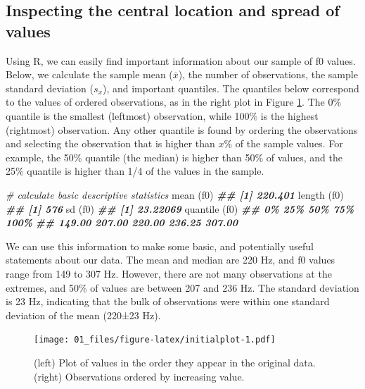\documentclass[
]{book}
\newenvironment{Shaded}{\begin{snugshade}}{\end{snugshade}}
\newcommand{\CommentTok}[1]{\textcolor[rgb]{0.56,0.35,0.01}{\textit{#1}}}
\newcommand{\DocumentationTok}[1]{\textcolor[rgb]{0.56,0.35,0.01}{\textbf{\textit{#1}}}}
\newcommand{\FunctionTok}[1]{\textcolor[rgb]{0.00,0.00,0.00}{#1}}
\newcommand{\NormalTok}[1]{#1}
\begin{document}
\hypertarget{inspecting-the-central-location-and-spread-of-values}{%
\subsection{Inspecting the central location and spread of values}\label{inspecting-the-central-location-and-spread-of-values}}

Using R, we can easily find important information about our sample of f0 values. Below, we calculate the sample mean (\(\bar{x}\)), the number of observations, the sample standard deviation (\(s_x\)), and important quantiles. The quantiles below correspond to the values of ordered observations, as in the right plot in Figure \ref{fig:initialplot}. The 0\% quantile is the smallest (leftmost) observation, while 100\% is the highest (rightmost) observation. Any other quantile is found by ordering the observations and selecting the observation that is higher than \(x\%\) of the sample values. For example, the 50\% quantile (the median) is higher than 50\% of values, and the 25\% quantile is higher than 1/4 of the values in the sample.

\begin{Shaded}
\begin{Highlighting}[]
\CommentTok{\# calculate basic descriptive statistics}
\FunctionTok{mean}\NormalTok{ (f0)}
\DocumentationTok{\#\# [1] 220.401}
\FunctionTok{length}\NormalTok{ (f0)}
\DocumentationTok{\#\# [1] 576}
\FunctionTok{sd}\NormalTok{ (f0)}
\DocumentationTok{\#\# [1] 23.22069}
\FunctionTok{quantile}\NormalTok{ (f0)}
\DocumentationTok{\#\#     0\%    25\%    50\%    75\%   100\% }
\DocumentationTok{\#\# 149.00 207.00 220.00 236.25 307.00}
\end{Highlighting}
\end{Shaded}

We can use this information to make some basic, and potentially useful statements about our data. The mean and median are 220 Hz, and f0 values range from 149 to 307 Hz. However, there are not many observations at the extremes, and 50\% of values are between 207 and 236 Hz. The standard deviation is 23 Hz, indicating that the bulk of observations were within one standard deviation of the mean (220±23 Hz).

\begin{figure}
\centering
\texttt{[image: 01\_files/figure-latex/initialplot-1.pdf]}
\caption{\label{fig:initialplot}(left) Plot of values in the order they appear in the original data. (right) Observations ordered by increasing value.}
\end{figure}
\end{document}
